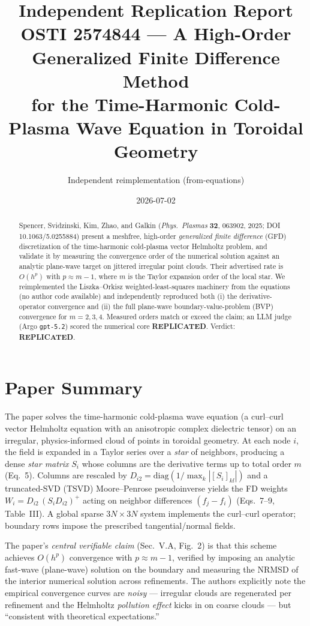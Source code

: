 \documentclass[11pt]{article}
\title{Independent Replication Report \\
  \large OSTI 2574844 --- A High-Order Generalized Finite Difference Method \\
  for the Time-Harmonic Cold-Plasma Wave Equation in Toroidal Geometry}
\author{Independent reimplementation (from-equations)}
\date{2026-07-02}
\begin{document}
\maketitle

\begin{abstract}
Spencer, Svidzinski, Kim, Zhao, and Galkin (\emph{Phys.\ Plasmas} \textbf{32},
063902, 2025; DOI 10.1063/5.0255884) present a meshfree, high-order
\emph{generalized finite difference} (GFD) discretization of the time-harmonic
cold-plasma vector Helmholtz problem, and validate it by measuring the
convergence order of the numerical solution against an analytic plane-wave
target on jittered irregular point clouds. Their advertised rate is
$O(h^{p})$ with $p \approx m-1$, where $m$ is the Taylor expansion order of the
local star. We reimplemented the Liszka--Orkisz weighted-least-squares
machinery from the equations (no author code available) and independently
reproduced both (i) the derivative-operator convergence and (ii) the full
plane-wave boundary-value-problem (BVP) convergence for $m=2,3,4$. Measured
orders match or exceed the claim; an LLM judge (Argo \texttt{gpt-5.2})
scored the numerical core \textbf{REPLICATED}. Verdict: \textbf{REPLICATED}.
\end{abstract}

\section{Paper Summary}
The paper solves the time-harmonic cold-plasma wave equation
(a curl--curl vector Helmholtz equation with an anisotropic complex dielectric
tensor) on an irregular, physics-informed cloud of points in toroidal geometry.
At each node $i$, the field is expanded in a Taylor series over a
\emph{star} of neighbors, producing a dense \emph{star matrix} $S_i$ whose
columns are the derivative terms up to total order $m$ (Eq.~5).
Columns are rescaled by $D_{i2}=\mathrm{diag}(1/\max_k|[S_i]_{kl}|)$ and
a truncated-SVD (TSVD) Moore--Penrose pseudoinverse yields the FD weights
$W_i = D_{i2}\,(S_i D_{i2})^{+}$ acting on neighbor differences
$(f_j-f_i)$ (Eqs.~7--9, Table~III). A global sparse $3N\times 3N$ system
implements the curl--curl operator; boundary rows impose the prescribed
tangential/normal fields.

The paper's \emph{central verifiable claim} (Sec.~V.A, Fig.~2) is that this
scheme achieves $O(h^{p})$ convergence with $p\approx m-1$, verified by
imposing an analytic fast-wave (plane-wave) solution on the boundary and
measuring the NRMSD of the interior numerical solution across refinements.
The authors explicitly note the empirical convergence curves are
\emph{noisy} --- irregular clouds are regenerated per refinement and the
Helmholtz \emph{pollution effect} kicks in on coarse clouds --- but
``consistent with theoretical expectations.''
\end{document}
